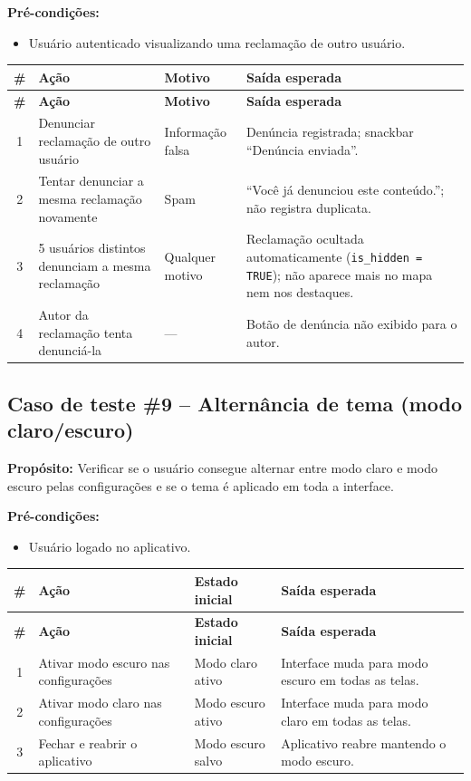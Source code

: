 \textbf{Pré-condições:}
\begin{itemize}
  \item Usuário autenticado visualizando uma reclamação de outro usuário.
\end{itemize}

\begin{longtable}{|c|p{4cm}|p{3cm}|p{4.5cm}|}
  \hline
  \textbf{\#} & \textbf{Ação} & \textbf{Motivo} & \textbf{Saída esperada} \\
  \hline
  \endfirsthead
  \hline
  \textbf{\#} & \textbf{Ação} & \textbf{Motivo} & \textbf{Saída esperada} \\
  \hline
  \endhead
  1 & Denunciar reclamação de outro usuário & Informação falsa & Denúncia registrada; snackbar ``Denúncia enviada''. \\
  \hline
  2 & Tentar denunciar a mesma reclamação novamente & Spam & ``Você já denunciou este conteúdo.''; não registra duplicata. \\
  \hline
  3 & 5 usuários distintos denunciam a mesma reclamação & Qualquer motivo & Reclamação ocultada automaticamente (\texttt{is\_hidden = TRUE}); não aparece mais no mapa nem nos destaques. \\
  \hline
  4 & Autor da reclamação tenta denunciá-la & — & Botão de denúncia não exibido para o autor. \\
  \hline
\end{longtable}

\subsection*{Caso de teste \#9 – Alternância de tema (modo claro/escuro)}

\textbf{Propósito:} Verificar se o usuário consegue alternar entre modo claro
e modo escuro pelas configurações e se o tema é aplicado em toda a interface.

\textbf{Pré-condições:}
\begin{itemize}
  \item Usuário logado no aplicativo.
\end{itemize}

\begin{longtable}{|c|p{4cm}|p{4cm}|p{4cm}|}
  \hline
  \textbf{\#} & \textbf{Ação} & \textbf{Estado inicial} & \textbf{Saída esperada} \\
  \hline
  \endfirsthead
  \hline
  \textbf{\#} & \textbf{Ação} & \textbf{Estado inicial} & \textbf{Saída esperada} \\
  \hline
  \endhead
  1 & Ativar modo escuro nas configurações & Modo claro ativo & Interface muda para modo escuro em todas as telas. \\
  \hline
  2 & Ativar modo claro nas configurações & Modo escuro ativo & Interface muda para modo claro em todas as telas. \\
  \hline
  3 & Fechar e reabrir o aplicativo & Modo escuro salvo & Aplicativo reabre mantendo o modo escuro. \\
  \hline
\end{longtable}
